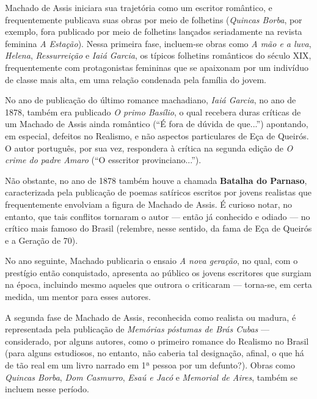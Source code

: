 Machado de Assis iniciara sua trajetória como um escritor romântico, e frequentemente publicava suas obras por meio de folhetins (\textit{Quincas Borba}, por exemplo, fora publicado por meio de folhetins lançados seriadamente na revista feminina \textit{A Estação}). Nessa primeira fase, incluem-se obras como \textit{A mão e a luva}, \textit{Helena}, \textit{Ressurreição} e \textit{Iaiá Garcia}, os típicos folhetins românticos do século XIX, frequentemente com protagonistas femininas que se apaixonam por um indivíduo de classe mais alta, em uma relação condenada pela família do jovem.

No ano de publicação do último romance machadiano, \textit{Iaiá Garcia}, no ano de 1878, também era publicado \textit{O primo Basílio}, o qual recebera duras críticas de um Machado de Assis ainda romântico (``É fora de dúvida de que...'') apontando, em especial, defeitos no Realismo, e não aspectos particulares de Eça de Queirós. O autor português, por sua vez, respondera à crítica na segunda edição de \textit{O crime do padre Amaro} (``O esscritor provinciano...'').


Não obstante, no ano de 1878 também houve a chamada \textbf{Batalha do Parnaso}, caracterizada pela publicação de poemas satíricos escritos por jovens realistas que frequentemente envolviam a figura de Machado de Assis. É curioso notar, no entanto, que tais conflitos tornaram o autor — então já conhecido e odiado — no crítico mais famoso do Brasil (relembre, nesse sentido, da fama de Eça de Queirós e a Geração de 70).

No ano seguinte, Machado publicaria o ensaio \textit{A nova geração}, no qual, com o prestígio então conquistado, apresenta ao público os jovens escritores que surgiam na época, incluindo mesmo aqueles que outrora o criticaram — torna-se, em certa medida, um mentor para esses autores.

A segunda fase de Machado de Assis, reconhecida como realista ou madura, é representada pela publicação de \textit{Memórias póstumas de Brás Cubas} — considerado, por alguns autores, como o primeiro romance do Realismo no Brasil (para alguns estudiosos, no entanto, não caberia tal designação, afinal, o que há de tão real em um livro narrado em 1ª pessoa por um defunto?). Obras como \textit{Quincas Borba}, \textit{Dom Casmurro}, \textit{Esaú e Jacó} e \textit{Memorial de Aires}, também se incluem nesse período.